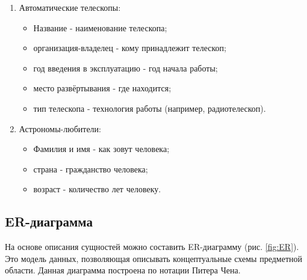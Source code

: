 \documentclass[14pt]{extreport}
\begin{document}
{\begin{enumerate}
        \item Автоматические телескопы:

        \begin{itemize}
            \item Название - наименование телескопа;
        
            \item организация-владелец - кому принадлежит телескоп;
            
            \item год введения в эксплуатацию - год начала работы;
            
            \item место развёртывания - где находится;  
            
            \item тип телескопа - технология работы (например, радиотелескоп).
        \end{itemize}

        \item Астрономы-любители:

        \begin{itemize}
            \item Фамилия и имя - как зовут человека;
        
            \item страна - гражданство человека;
            
            \item возраст - количество лет человеку.
        \end{itemize}

    \end{enumerate}

        \subsection{ER-диаграмма}

        На основе описания сущностей можно составить ER-диаграмму (рис. \ref{fig:ER}). Это модель данных, позволяющая описывать концептуальные схемы предметной области. Данная диаграмма построена по нотации Питера Чена.

        \newpage

        \clearpage
  
  \begin{landscape}
    \thispagestyle{empty}
    

\end{landscape}}
\end{document}

